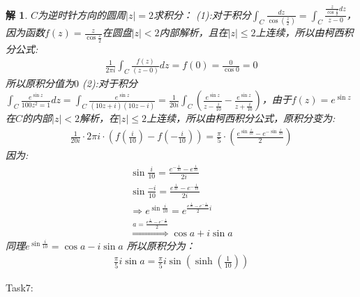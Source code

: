 \documentclass{ctexart}
\newcommand{\。}{．} %
\newenvironment{lanse}{
    \begin{tcolorbox}[breakable,enhanced, colback=qlan, boxrule=0pt, frame hidden,
        borderline west={0.7mm}{0.1mm}{slan}]
    }
    {\end{tcolorbox}}
\theoremstyle{t} %
\newtheorem*{tmhj}{\color{slan} 解}
\newenvironment{tm}{\begin{lanse}\begin{tmhj}}{\end{tmhj}\end{lanse}}
\begin{document}
\begin{tm}
$C$为逆时针方向的圆周$|z|=2$求积分：
(1):对于积分$\int_{C}\frac{dz}{\cos(\frac{z}{2})}=\int_{C}\frac{\frac{z}{\cos \frac{z}{2}}dz}{z-0}$，因为函数$f(z)=\frac{z}{\cos \frac{z}{2}}$在圆盘$|z|<2$内部解析，且在$|z|\le 2$上连续，所以由柯西积分公式:
\begin{align*}
    \frac{1}{2\pi i}\int_{C}\frac{f(z)}{(z-0)}dz=f(0)=\frac{0}{\cos 0}=0
\end{align*}
所以原积分值为$0$
(2):对于积分$\int_{C}\frac{e^{\sin z}}{100z^2=1}dz=\int_{C}\frac{e^{\sin z}}{(10z+i)(10z-i)}=\frac{1}{20i}\int_{C}(\frac{e^{\sin z}}{z-\frac{i}{10}}-\frac{e^{\sin z}}{z+\frac{i}{10}})$，由于$f(z)=e^{\sin z}$在$C$的内部$|z|<2$解析，在$|z|\le 2$上连续，所以由柯西积分公式，原积分变为:
\begin{align*}
    \frac{1}{20i}\cdot 2\pi i\cdot (f(\frac{i}{10})-f(-\frac{i}{10}))=\frac{\pi}{5}\cdot \left(\frac{e^{\sin \frac{i}{10}}-e^{-\sin \frac{i}{10}}}{2}\right)
\end{align*}
因为:
\begin{align*}
    \sin\frac{i}{10}=\frac{e^{-\frac{1}{10}}-e^{\frac{1}{10}}}{2i}\\
    \sin\frac{-i}{10}=\frac{e^{\frac{1}{10}}-e^{-\frac{1}{10}}}{2i}\\
    \Rightarrow e^{\sin\frac{i}{10}}=e^{\frac{e^{\frac{1}{10}}-e^{-\frac{1}{10}}}{2}i}\\
    \overset{a=\frac{e^{\frac{1}{10}}-e^{-\frac{1}{10}}}{2}}{\Rightarrow}\cos a+i\sin a
\end{align*}
同理$e^{\sin\frac{i}{10}}=\cos a-i\sin a$
所以原积分为：
\begin{align*}
    \frac{\pi}{5}i\sin a=\frac{\pi}{5}i\sin\left(\sinh \left(\frac{1}{10}\right)\right)
\end{align*}
\end{tm}
Task7:
\end{document}
